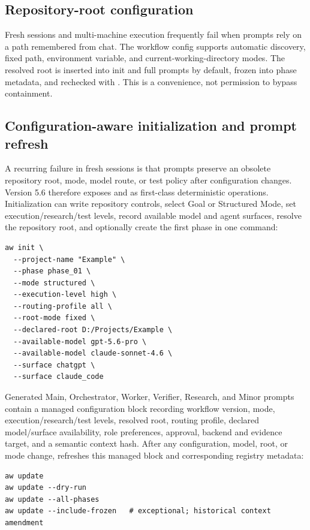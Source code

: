 \documentclass[11pt,a4paper]{article}
\newcommand{\code}[1]{\texttt{\detokenize{#1}}}
\begin{document}
\subsection{Repository-root configuration}

Fresh sessions and multi-machine execution frequently fail when prompts rely on a path remembered
from chat. The workflow config supports automatic discovery, fixed path, environment variable, and
current-working-directory modes. The resolved root is inserted into init and full prompts by
default, frozen into phase metadata, and rechecked with \code{aw root show}. This is a convenience,
not permission to bypass containment.


\subsection{Configuration-aware initialization and prompt refresh}

A recurring failure in fresh sessions is that prompts preserve an obsolete repository root, mode,
model route, or test policy after configuration changes. Version 5.6 therefore exposes
\code{aw init} and \code{aw update} as first-class deterministic operations. Initialization can
write repository controls, select Goal or Structured Mode, set execution/research/test levels,
record available model and agent surfaces, resolve the repository root, and optionally create the
first phase in one command:

\begin{lstlisting}[style=workflow]
aw init \
  --project-name "Example" \
  --phase phase_01 \
  --mode structured \
  --execution-level high \
  --routing-profile all \
  --root-mode fixed \
  --declared-root D:/Projects/Example \
  --available-model gpt-5.6-pro \
  --available-model claude-sonnet-4.6 \
  --surface chatgpt \
  --surface claude_code
\end{lstlisting}

Generated Main, Orchestrator, Worker, Verifier, Research, and Minor prompts contain a managed
configuration block recording workflow version, mode, execution/research/test levels, resolved
root, routing profile, declared model/surface availability, role preferences, approval, backend and
evidence target, and a semantic context hash. After any configuration, model, root, or mode change,
\code{aw update} refreshes this managed block and corresponding registry metadata:

\begin{lstlisting}[style=workflow]
aw update
aw update --dry-run
aw update --all-phases
aw update --include-frozen   # exceptional; historical context amendment
\end{lstlisting}
\end{document}
